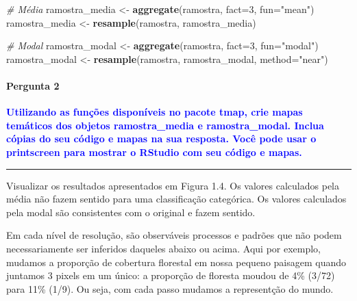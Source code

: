 \documentclass[
]{article}
\newenvironment{Shaded}{\begin{snugshade}}{\end{snugshade}}
\newcommand{\AttributeTok}[1]{\textcolor[rgb]{0.13,0.29,0.53}{#1}}
\newcommand{\CommentTok}[1]{\textcolor[rgb]{0.56,0.35,0.01}{\textit{#1}}}
\newcommand{\DecValTok}[1]{\textcolor[rgb]{0.00,0.00,0.81}{#1}}
\newcommand{\FunctionTok}[1]{\textcolor[rgb]{0.13,0.29,0.53}{\textbf{#1}}}
\newcommand{\NormalTok}[1]{#1}
\newcommand{\OtherTok}[1]{\textcolor[rgb]{0.56,0.35,0.01}{#1}}
\newcommand{\StringTok}[1]{\textcolor[rgb]{0.31,0.60,0.02}{#1}}
\begin{document}
\begin{Shaded}
\begin{Highlighting}[]
\CommentTok{\# Média}
\NormalTok{ramostra\_media }\OtherTok{\textless{}{-}} \FunctionTok{aggregate}\NormalTok{(ramostra, }\AttributeTok{fact=}\DecValTok{3}\NormalTok{, }\AttributeTok{fun=}\StringTok{"mean"}\NormalTok{)}
\NormalTok{ramostra\_media }\OtherTok{\textless{}{-}} \FunctionTok{resample}\NormalTok{(ramostra, ramostra\_media)}

\CommentTok{\# Modal}
\NormalTok{ramostra\_modal }\OtherTok{\textless{}{-}} \FunctionTok{aggregate}\NormalTok{(ramostra, }\AttributeTok{fact=}\DecValTok{3}\NormalTok{, }\AttributeTok{fun=}\StringTok{"modal"}\NormalTok{)}
\NormalTok{ramostra\_modal }\OtherTok{\textless{}{-}} \FunctionTok{resample}\NormalTok{(ramostra, ramostra\_modal, }\AttributeTok{method=}\StringTok{"near"}\NormalTok{)}
\end{Highlighting}
\end{Shaded}

\hypertarget{pergunta-2}{%
\paragraph{Pergunta 2}\label{pergunta-2}}

\textcolor{blue}{\textbf{Utilizando as funções disponíveis no pacote tmap, crie mapas temáticos dos objetos ramostra\_media e ramostra\_modal. Inclua cópias do seu código e mapas na sua resposta. Você pode usar o printscreen para mostrar o RStudio com seu código e mapas.}}

\begin{center}\rule{0.5\linewidth}{0.5pt}\end{center}

\newpage

Visualizar os resultados apresentados em Figura 1.4. Os valores calculados pela média não fazem sentido para uma classificação categórica.
Os valores calculados pela modal são consistentes com o original e fazem sentido.

\newpage

Em cada nível de resolução, são observáveis processos e padrões que não podem necessariamente ser inferidos daqueles abaixo ou acima. Aqui por exemplo, mudamos a proporção de cobertura florestal em nossa pequeno paisagem quando juntamos 3 pixels em um único: a proporção de floresta moudou de 4\% (3/72) para 11\% (1/9). Ou seja, com cada passo mudamos a representção do mundo.
\end{document}
